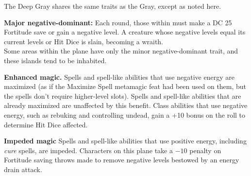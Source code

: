 
The Deep Gray shares the same traits as the Gray, except as noted here.
\begin{itemize*}
\item \textbf{Major negative-dominant:} Each round, those within must make a DC 25 Fortitude save or gain a negative level. A creature whose negative levels equal its current levels or Hit Dice is slain, becoming a wraith.\\

Some areas within the plane have only the minor negative-dominant trait, and these islands tend to be inhabited.
\item \textbf{Enhanced magic.} Spells and spell-like abilities that use negative energy are maximized (as if the Maximize Spell metamagic feat had been used on them, but the spells don't require higher-level slots). Spells and spell-like abilities that are already maximized are unaffected by this benefit. Class abilities that use negative energy, such as rebuking and controlling undead, gain a +10 bonus on the roll to determine Hit Dice affected.
\item \textbf{Impeded magic} Spells and spell-like abilities that use positive energy, including \emph{cure} spells, are impeded. Characters on this plane take a $-10$ penalty on Fortitude saving throws made to remove negative levels bestowed by an energy drain attack.
\end{itemize*}
